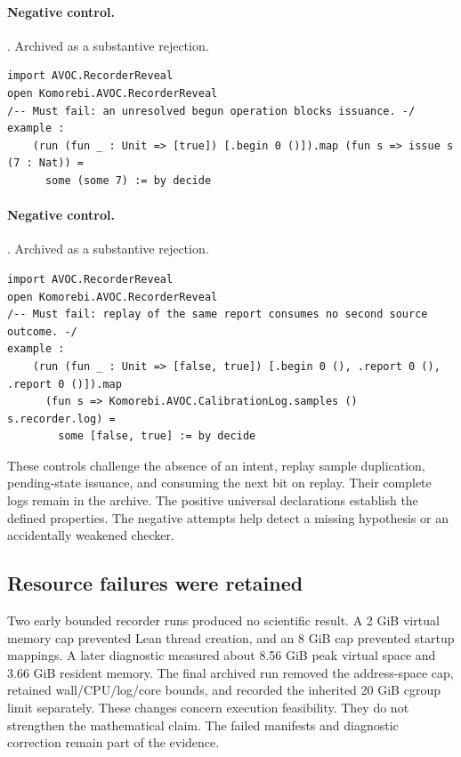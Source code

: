 \documentclass[11pt]{article}
\begin{document}
\paragraph{Negative control.}. Archived as a substantive rejection.
\begin{lstlisting}[style=AVOCSource]
import AVOC.RecorderReveal
open Komorebi.AVOC.RecorderReveal
/-- Must fail: an unresolved begun operation blocks issuance. -/
example :
    (run (fun _ : Unit => [true]) [.begin 0 ()]).map (fun s => issue s (7 : Nat)) =
      some (some 7) := by decide
\end{lstlisting}

\paragraph{Negative control.}. Archived as a substantive rejection.
\begin{lstlisting}[style=AVOCSource]
import AVOC.RecorderReveal
open Komorebi.AVOC.RecorderReveal
/-- Must fail: replay of the same report consumes no second source outcome. -/
example :
    (run (fun _ : Unit => [false, true]) [.begin 0 (), .report 0 (), .report 0 ()]).map
      (fun s => Komorebi.AVOC.CalibrationLog.samples () s.recorder.log) =
        some [false, true] := by decide
\end{lstlisting}


These controls challenge the absence of an intent, replay sample duplication,
pending-state issuance, and consuming the next bit on replay. Their complete
logs remain in the archive. The positive universal declarations establish the
defined properties. The negative attempts help detect a missing hypothesis or
an accidentally weakened checker.

\subsection{Resource failures were retained}
Two early bounded recorder runs produced no scientific result. A 2 GiB virtual
memory cap prevented Lean thread creation, and an 8 GiB cap prevented startup
mappings. A later diagnostic measured about 8.56 GiB peak virtual space and
3.66 GiB resident memory. The final archived run removed the address-space
cap, retained wall/CPU/log/core bounds, and recorded the inherited 20 GiB cgroup
limit separately. These changes concern execution feasibility. They do not
strengthen the mathematical claim. The failed manifests and diagnostic
correction remain part of the evidence.
\end{document}
